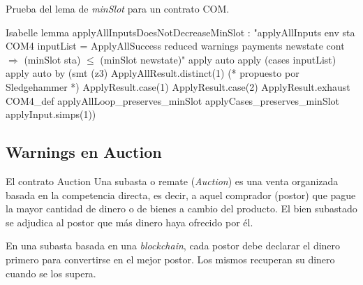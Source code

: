 \documentclass{beamer}
\begin{document}
\begin{frame}[fragile]{Prueba del lema de \textit{minSlot} para un contrato COM.}

\begin{code}{Isabelle}
lemma applyAllInputsDoesNotDecreaseMinSlot :
"applyAllInputs env sta COM4 inputList = 
    ApplyAllSuccess reduced warnings payments newstate cont $\Longrightarrow$
  (minSlot sta) $\leq$ (minSlot newstate)"
  apply auto
  apply (cases inputList)
  apply auto 
  by (smt (z3) ApplyAllResult.distinct(1) (* propuesto por Sledgehammer *)
                  ApplyResult.case(1)
                  ApplyResult.case(2)
                  ApplyResult.exhaust
                  COM4_def
                  applyAllLoop_preserves_minSlot
                  applyCases_preserves_minSlot applyInput.simps(1))
\end{code}

\end{frame}

\subsection{Warnings en Auction}

\begin{frame}{El contrato Auction}
Una subasta o remate (\textit{Auction}) es una venta organizada basada en la competencia directa, es decir, a aquel comprador (postor) que pague la mayor cantidad de dinero o de bienes a cambio del producto. El bien subastado se adjudica al postor que más dinero haya ofrecido por él.

\vfill
\pause

En una subasta basada en una \textit{blockchain}, cada postor debe declarar el dinero primero para convertirse en el mejor postor. Los mismos recuperan su dinero cuando se los supera.

\end{frame}
\end{document}
